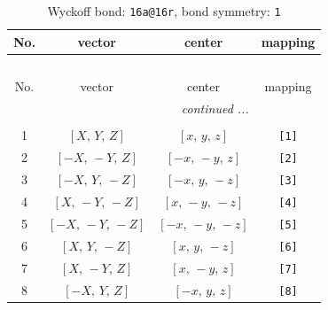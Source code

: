 \documentclass[fleqn,8pt]{jsarticle}
\begin{document}
\begin{longtable}{cccc}
\caption{Wyckoff bond: {\tt 16a@16r}, bond symmetry: {\tt 1}}
 \\
 \hline \hline
No. & vector & center & mapping \\ \hline \endfirsthead

\multicolumn{3}{l}{\tablename\ \thetable{}} \\
 \hline \hline
No. & vector & center & mapping \\ \hline \endhead

 \hline \hline
\multicolumn{3}{r}{\footnotesize\it continued ...} \\ \endfoot

 \hline \hline
\multicolumn{3}{r}{} \\ \endlastfoot

1 & $\left[ X,\, Y,\, Z \right]$ & $\left[ x,\, y,\, z \right]$ & {\tt [1]} \\ \hline
2 & $\left[ - X,\, - Y,\, Z \right]$ & $\left[ - x,\, - y,\, z \right]$ & {\tt [2]} \\ \hline
3 & $\left[ - X,\, Y,\, - Z \right]$ & $\left[ - x,\, y,\, - z \right]$ & {\tt [3]} \\ \hline
4 & $\left[ X,\, - Y,\, - Z \right]$ & $\left[ x,\, - y,\, - z \right]$ & {\tt [4]} \\ \hline
5 & $\left[ - X,\, - Y,\, - Z \right]$ & $\left[ - x,\, - y,\, - z \right]$ & {\tt [5]} \\ \hline
6 & $\left[ X,\, Y,\, - Z \right]$ & $\left[ x,\, y,\, - z \right]$ & {\tt [6]} \\ \hline
7 & $\left[ X,\, - Y,\, Z \right]$ & $\left[ x,\, - y,\, z \right]$ & {\tt [7]} \\ \hline
8 & $\left[ - X,\, Y,\, Z \right]$ & $\left[ - x,\, y,\, z \right]$ & {\tt [8]} \\
\end{longtable}
\end{document}
